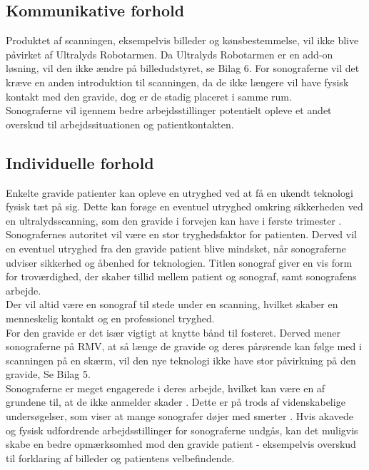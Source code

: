 \subsection{Kommunikative forhold}
Produktet af scanningen, eksempelvis billeder og kønsbestemmelse, vil ikke blive påvirket af Ultralyds Robotarmen. Da Ultralyds Robotarmen er en add-on løsning, vil den ikke ændre på billedudstyret, se Bilag 6. 
For sonograferne vil det kræve en anden introduktion til scanningen, da de ikke længere vil have fysisk kontakt med den gravide, dog er de stadig placeret i samme rum.  \\
Sonograferne vil igennem bedre arbejdsstillinger potentielt opleve et andet overskud til arbejdssituationen og patientkontakten.  

\subsection{Individuelle forhold}
Enkelte gravide patienter kan opleve en utryghed ved at få en ukendt teknologi fysisk tæt på sig. Dette kan forøge en eventuel utryghed omkring sikkerheden ved en ultralydsscanning, som den gravide i forvejen kan have i første trimester \cite{29}. \\
Sonografernes autoritet vil være en stor tryghedsfaktor for patienten. Derved vil en eventuel utryghed fra den gravide patient blive mindsket, når sonograferne udviser sikkerhed og åbenhed for teknologien. Titlen sonograf giver en vis form for troværdighed, der skaber tillid mellem patient og sonograf, samt sonografens arbejde.\\
Der vil altid være en sonograf til stede under en scanning, hvilket skaber en menneskelig kontakt og en professionel tryghed.\\
For den gravide er det især vigtigt at knytte bånd til fosteret. Derved mener sonograferne på RMV, at så længe de gravide og deres pårørende kan følge med i scanningen på en skærm, vil den nye teknologi ikke have stor påvirkning på den gravide, Se Bilag 5. \\  
Sonograferne er meget engagerede i deres arbejde, hvilket kan være en af grundene til, at de ikke anmelder skader \cite{1} \cite{24}. Dette er på trods af videnskabelige undersøgelser, som viser at mange sonografer døjer med smerter \cite{32} \cite{24} \cite{36} . 
Hvis akavede og fysisk udfordrende arbejdsstillinger for sonograferne undgås, kan det muligvis skabe en bedre opmærksomhed mod den gravide patient - eksempelvis overskud til forklaring af billeder og patientens velbefindende.  

